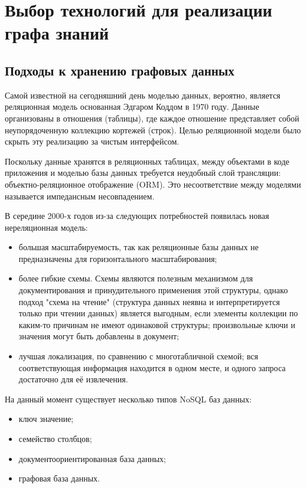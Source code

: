 \chapter{Выбор технологий для реализации графа знаний} \label{ch2}


\section{Подходы к хранению графовых данных}

Самой известной на сегодняшний день моделью данных, вероятно, является реляционная модель основанная Эдгаром Коддом в 1970 году. Данные
организованы в отношения (таблицы), где каждое отношение представляет собой неупорядоченную коллекцию кортежей (строк). Целью реляционной
модели было скрыть эту реализацию за чистым интерфейсом.

Поскольку данные хранятся в реляционных таблицах, между объектами в коде приложения и моделью базы данных требуется неудобный слой
трансляции: объектно-реляционное отображение (ORM). Это несоответствие между моделями называется импедансным несовпадением.

В середине 2000-х годов из-за следующих потребностей появилась новая нереляционная модель:

\begin{itemize}
    \item большая масштабируемость, так как реляционные базы данных не предназначены для горизонтального масштабирования;
    \item более гибкие схемы. Схемы являются полезным механизмом для документирования и принудительного применения этой структуры, однако подход "схема на чтение" (структура данных неявна и интерпретируется только при чтении данных) является выгодным, если элементы коллекции по каким-то причинам не имеют одинаковой структуры; произвольные ключи и значения могут быть добавлены в документ;
    \item лучшая локализация, по сравнению с многотабличной схемой; вся соответствующая информация находится в одном месте, и одного запроса достаточно для её извлечения.
\end{itemize}

На данный момент существует несколько типов NoSQL баз данных:

\begin{itemize}
    \item ключ значение;
    \item семейство столбцов;
    \item документоориентированная база данных;
    \item графовая база данных.
\end{itemize}

